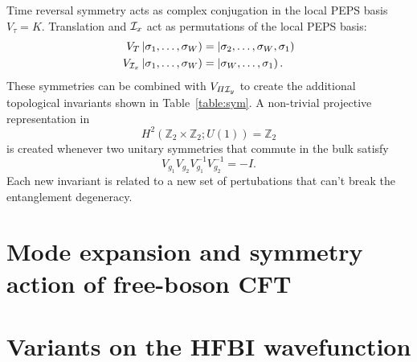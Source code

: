 Time reversal symmetry acts as complex conjugation in the local PEPS basis $V_{\tau}=K$.
Translation and $\mathcal{I}_x$ act as permutations of the local PEPS basis:
\begin{equation*}
\begin{split}
V_{T}\left |\sigma_1, \ldots, \sigma_{W} \right ) &= \left |\sigma_2, \ldots, \sigma_{W}, \sigma_{1} \right ) \\
V_{\mathcal{I}_x}\left |\sigma_1, \ldots, \sigma_{W} \right ) &= \left |\sigma_W, \ldots, \sigma_{1} \right ).
\end{split}
\end{equation*}
These symmetries can be combined with $V_{\varPi \mathcal{I}_y}$ to create the additional topological 
invariants shown in Table~\ref{table:sym}. A non-trivial projective 
representation in $$H^2(\mathbb{Z}_2 \times \mathbb{Z}_2; U(1)) = \mathbb{Z}_2$$
is created whenever two unitary symmetries that commute in the bulk satisfy 
$$V_{g_1} V_{g_2} V_{g_1}^{-1} V_{g_2}^{-1} = -I.$$
Each new invariant is related to a new set of pertubations that can't break the entanglement 
degeneracy. 

\section{Mode expansion and symmetry action of free-boson CFT}
\label{Appendix:CFT}

\section{Variants on the HFBI wavefunction}
